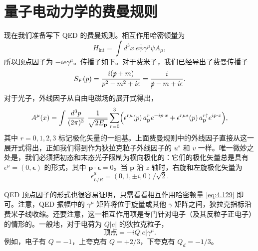 \section{量子电动力学的费曼规则}

现在我们准备写下 QED 的费曼规则。相互作用哈密顿量为
\begin{equation}
  H_{\mathrm{int}} = \int d^3x\ e\bar{\psi}\gamma^\mu\psi A_\mu ,
  \label{eq:4.129}
\end{equation}
所以顶点因子为 $-ie\gamma^\mu$。传播子如下。对于费米子，我们已经导出了费曼传播子
\begin{equation}
  S_F(p) = \frac{i(\slashed{p}+m)}{p^2-m^2+i\epsilon}
    = \frac{i}{\slashed{p}-m+i\epsilon} .
  \label{eq:4.130}
\end{equation}
对于光子，外线因子从自由电磁场的展开式得出，
\begin{equation}
  A^\mu(x) = \int \frac{d^3p}{(2\pi)^3}\ \frac{1}{\sqrt{2E_{\mathbf{p}}}}
    \sum_{r=0}^{3} \Bigl( \epsilon^{r\mu}(p)\,a_{\mathbf{p}}^r e^{-ip\cdot x}
      + \epsilon^{r\mu*}(p)\,a_{\mathbf{p}}^{r\dagger}e^{ip\cdot x} \Bigr),
  \label{eq:4.131}
\end{equation}
其中 $r = 0, 1, 2, 3$ 标记极化矢量的一组基。上面费曼规则中的外线因子直接从这一展开式得出，正如我们得到作为狄拉克粒子外线因子的 $u^s$ 和 $v$ 一样。唯一微妙之处是，我们必须把初态和末态光子限制为横向极化的：它们的极化矢量总是具有 $\epsilon^\mu = (0, \bm{\epsilon})$ 的形式，其中 $\mathbf{p}\cdot\bm{\epsilon} = 0$。当 $\mathbf{p}$ 沿 $z$ 轴时，右旋和左旋极化矢量为
\begin{equation}
  \epsilon^{\mu}_{L/R} = (0, 1, \pm i, 0)/\sqrt{2} .
  \label{eq:4.132}
\end{equation}

QED 顶点因子的形式也很容易证明，只需看看相互作用哈密顿量 \eqref{eq:4.129} 即可。注意，QED 振幅中的 $\gamma^\mu$ 矩阵将位于旋量或其他 $\gamma$ 矩阵之间，狄拉克指标沿费米子线收缩。还要注意，这一相互作用项是专门针对电子（及其反粒子正电子）的情形的。一般地，对于电荷为 $Q|e|$ 的狄拉克粒子，
\begin{equation}
  \text{顶点} = -iQ|e|\gamma^\mu .
  \label{eq:4.133}
\end{equation}
例如，电子有 $Q = -1$，上夸克有 $Q = +2/3$，下夸克有 $Q_d = -1/3$。

